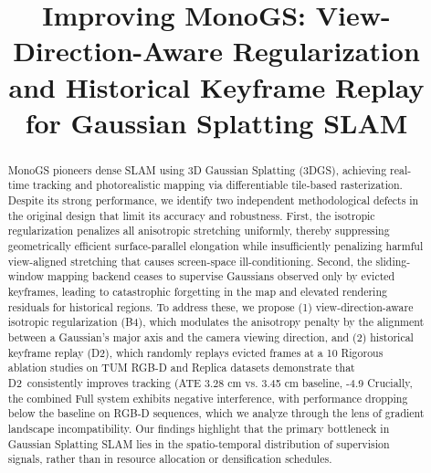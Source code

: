 \documentclass[conference]{IEEEtran}
\begin{document}
\title{Improving MonoGS: View-Direction-Aware Regularization and Historical Keyframe Replay for Gaussian Splatting SLAM}

\author{
}

\maketitle

\begin{abstract}
MonoGS pioneers dense SLAM using 3D Gaussian Splatting (3DGS), achieving real-time tracking and photorealistic mapping via differentiable tile-based rasterization.
Despite its strong performance, we identify two independent methodological defects in the original design that limit its accuracy and robustness.
First, the isotropic regularization penalizes all anisotropic stretching uniformly, thereby suppressing geometrically efficient surface-parallel elongation while insufficiently penalizing harmful view-aligned stretching that causes screen-space ill-conditioning.
Second, the sliding-window mapping backend ceases to supervise Gaussians observed only by evicted keyframes, leading to catastrophic forgetting in the map and elevated rendering residuals for historical regions.
To address these, we propose (1) view-direction-aware isotropic regularization ({B4}), which modulates the anisotropy penalty by the alignment between a Gaussian's major axis and the camera viewing direction, and (2) historical keyframe replay ({D2}), which randomly replays evicted frames at a 10%
Rigorous ablation studies on TUM RGB-D and Replica datasets demonstrate that {D2}~consistently improves tracking (ATE 3.28 cm vs. 3.45 cm baseline, -4.9%
Crucially, the combined Full system exhibits negative interference, with performance dropping below the baseline on RGB-D sequences, which we analyze through the lens of gradient landscape incompatibility.
Our findings highlight that the primary bottleneck in Gaussian Splatting SLAM lies in the spatio-temporal distribution of supervision signals, rather than in resource allocation or densification schedules.
\end{abstract}
\end{document}

